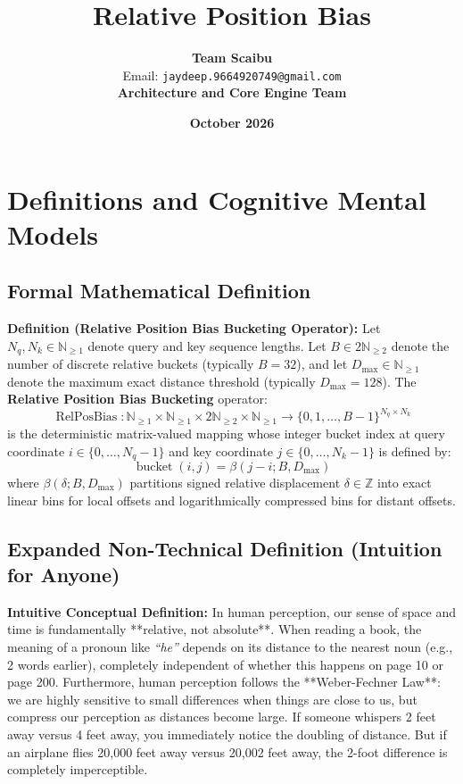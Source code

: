 \documentclass[11pt,a4paper]{article}
\title{\textbf{Relative Position Bias}}
\author{\textbf{Team Scaibu} \\ \small Email: \texttt{jaydeep.9664920749@gmail.com} \\ \small \textbf{Architecture and Core Engine Team}}
\date{\textbf{October 2026}}
\theoremstyle{definition}
\begin{document}
\maketitle

\section{Definitions and Cognitive Mental Models}

\subsection{Formal Mathematical Definition}
\textbf{Definition (Relative Position Bias Bucketing Operator):}
Let $N_q, N_k \in \mathbb{N}_{\ge 1}$ denote query and key sequence lengths. Let $B \in 2\mathbb{N}_{\ge 2}$ denote the number of discrete relative buckets (typically $B = 32$), and let $D_{\text{max}} \in \mathbb{N}_{\ge 1}$ denote the maximum exact distance threshold (typically $D_{\text{max}} = 128$).
The \textbf{Relative Position Bias Bucketing} operator:
{\boldmath
\begin{equation}
\operatorname{RelPosBias}: \mathbb{N}_{\ge 1} \times \mathbb{N}_{\ge 1} \times 2\mathbb{N}_{\ge 2} \times \mathbb{N}_{\ge 1} \longrightarrow \{0, 1, \dots, B-1\}^{N_q \times N_k}
\end{equation}
}
is the deterministic matrix-valued mapping whose integer bucket index at query coordinate $i \in \{0, \dots, N_q-1\}$ and key coordinate $j \in \{0, \dots, N_k-1\}$ is defined by:
{\boldmath
\begin{equation}
\operatorname{bucket}(i, j) = \beta(j - i; B, D_{\text{max}})
\end{equation}
}
where $\beta(\delta; B, D_{\text{max}})$ partitions signed relative displacement $\delta \in \mathbb{Z}$ into exact linear bins for local offsets and logarithmically compressed bins for distant offsets.

\subsection{Expanded Non-Technical Definition (Intuition for Anyone)}
\textbf{Intuitive Conceptual Definition:}
In human perception, our sense of space and time is fundamentally **relative, not absolute**. When reading a book, the meaning of a pronoun like \emph{``he''} depends on its distance to the nearest noun (e.g., 2 words earlier), completely independent of whether this happens on page 10 or page 200. Furthermore, human perception follows the **Weber-Fechner Law**: we are highly sensitive to small differences when things are close to us, but compress our perception as distances become large. If someone whispers 2 feet away versus 4 feet away, you immediately notice the doubling of distance. But if an airplane flies 20,000 feet away versus 20,002 feet away, the 2-foot difference is completely imperceptible.
\end{document}
